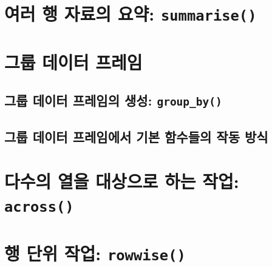 \documentclass[
]{book}
\begin{document}
\hypertarget{uxc5ecuxb7ec-uxd589-uxc790uxb8ccuxc758-uxc694uxc57d-summarise}{%
\section{\texorpdfstring{여러 행 자료의 요약: \texttt{summarise()}}{여러 행 자료의 요약: summarise()}}\label{uxc5ecuxb7ec-uxd589-uxc790uxb8ccuxc758-uxc694uxc57d-summarise}}

\hypertarget{uxadf8uxb8f9-uxb370uxc774uxd130-uxd504uxb808uxc784}{%
\section{그룹 데이터 프레임}\label{uxadf8uxb8f9-uxb370uxc774uxd130-uxd504uxb808uxc784}}

\hypertarget{uxadf8uxb8f9-uxb370uxc774uxd130-uxd504uxb808uxc784uxc758-uxc0dduxc131-group_by}{%
\subsection{\texorpdfstring{그룹 데이터 프레임의 생성: \texttt{group\_by()}}{그룹 데이터 프레임의 생성: group\_by()}}\label{uxadf8uxb8f9-uxb370uxc774uxd130-uxd504uxb808uxc784uxc758-uxc0dduxc131-group_by}}

\hypertarget{uxadf8uxb8f9-uxb370uxc774uxd130-uxd504uxb808uxc784uxc5d0uxc11c-uxae30uxbcf8-uxd568uxc218uxb4e4uxc758-uxc791uxb3d9-uxbc29uxc2dd}{%
\subsection{그룹 데이터 프레임에서 기본 함수들의 작동 방식}\label{uxadf8uxb8f9-uxb370uxc774uxd130-uxd504uxb808uxc784uxc5d0uxc11c-uxae30uxbcf8-uxd568uxc218uxb4e4uxc758-uxc791uxb3d9-uxbc29uxc2dd}}

\hypertarget{uxb2e4uxc218uxc758-uxc5f4uxc744-uxb300uxc0c1uxc73cuxb85c-uxd558uxb294-uxc791uxc5c5-across}{%
\section{\texorpdfstring{다수의 열을 대상으로 하는 작업: \texttt{across()}}{다수의 열을 대상으로 하는 작업: across()}}\label{uxb2e4uxc218uxc758-uxc5f4uxc744-uxb300uxc0c1uxc73cuxb85c-uxd558uxb294-uxc791uxc5c5-across}}

\hypertarget{uxd589-uxb2e8uxc704-uxc791uxc5c5-rowwise}{%
\section{\texorpdfstring{행 단위 작업: \texttt{rowwise()}}{행 단위 작업: rowwise()}}\label{uxd589-uxb2e8uxc704-uxc791uxc5c5-rowwise}}
\end{document}
